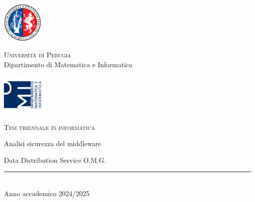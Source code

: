 \thispagestyle{empty} %

	\noindent %
	\includegraphics[width=0.15\textwidth]{img/logoUniPg}
	\begin{minipage}[b]{0.7\textwidth}
		\centering
		{\Large \textcolor{blu_dmi}{\textsc{Universit{\`a} di Perugia}}}\\
		\vspace{0.4 em}
		{\large \textcolor{blu_dmi}{Dipartimento di Matematica e Informatica}}
		\vspace{0.6 em}
	\end{minipage}%
	\includegraphics[width=0.15\textwidth]{img/logoDMI}
	
	\vspace{5 em}

	\begin{center}
		
		{\large \textcolor{blu_dmi}{\textsc{Tesi triennale in informatica}}}
		\vspace{8 em}
		
		{\Huge \textcolor{blu_dmi}{Analisi sicurezza del middleware}}
		\vspace{1.5 em}

		{\Huge \textcolor{blu_dmi}{Data Distribution Service O.M.G.}}
		
		\vspace{10 em}
		
		
		\vspace{6 em}
		\vfill
		
		\textcolor{blu_dmi}{\rule{380pt}{.4pt}}\\
		\vspace{1.2 em}
		\large{\textcolor{blu_dmi}{Anno accademico 2024/2025}}
		
		
		
		
	\end{center}

